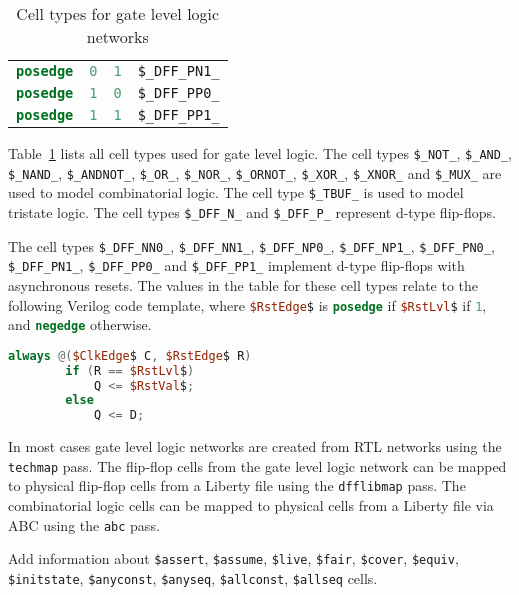 \begin{table}[t]
\begin{tabular}[t]{llll}
\lstinline[language=Verilog];posedge; & \lstinline[language=Verilog];0; & \lstinline[language=Verilog];1; & {\tt \$\_DFF\_PN1\_} \\
\lstinline[language=Verilog];posedge; & \lstinline[language=Verilog];1; & \lstinline[language=Verilog];0; & {\tt \$\_DFF\_PP0\_} \\
\lstinline[language=Verilog];posedge; & \lstinline[language=Verilog];1; & \lstinline[language=Verilog];1; & {\tt \$\_DFF\_PP1\_} \\
\end{tabular}
\caption{Cell types for gate level logic networks}
\label{tab:CellLib_gates}
\end{table}

Table~\ref{tab:CellLib_gates} lists all cell types used for gate level logic. The cell types
{\tt \$\_NOT\_}, {\tt \$\_AND\_}, {\tt \$\_NAND\_}, {\tt \$\_ANDNOT\_}, {\tt \$\_OR\_}, {\tt \$\_NOR\_},
{\tt \$\_ORNOT\_}, {\tt \$\_XOR\_}, {\tt \$\_XNOR\_} and {\tt \$\_MUX\_} are used to model combinatorial logic.
The cell type {\tt \$\_TBUF\_} is used to model tristate logic.
The cell types {\tt \$\_DFF\_N\_} and {\tt \$\_DFF\_P\_} represent d-type flip-flops.

The cell types {\tt \$\_DFF\_NN0\_}, {\tt \$\_DFF\_NN1\_}, {\tt \$\_DFF\_NP0\_}, {\tt \$\_DFF\_NP1\_},
{\tt \$\_DFF\_PN0\_}, {\tt \$\_DFF\_PN1\_}, {\tt \$\_DFF\_PP0\_} and {\tt \$\_DFF\_PP1\_} implement
d-type flip-flops with asynchronous resets. The values in the table for these cell types relate to the
following Verilog code template, where \lstinline[mathescape,language=Verilog];$RstEdge$; is \lstinline[language=Verilog];posedge;
if \lstinline[mathescape,language=Verilog];$RstLvl$; if \lstinline[language=Verilog];1;, and \lstinline[language=Verilog];negedge;
otherwise.

\begin{lstlisting}[mathescape,language=Verilog]
	always @($ClkEdge$ C, $RstEdge$ R)
		if (R == $RstLvl$)
			Q <= $RstVal$;
		else
			Q <= D;
\end{lstlisting}

In most cases gate level logic networks are created from RTL networks using the {\tt techmap} pass. The flip-flop cells
from the gate level logic network can be mapped to physical flip-flop cells from a Liberty file using the {\tt dfflibmap}
pass. The combinatorial logic cells can be mapped to physical cells from a Liberty file via ABC 
using the {\tt abc} pass.

\begin{fixme}
Add information about {\tt \$assert}, {\tt \$assume}, {\tt \$live}, {\tt \$fair}, {\tt \$cover}, {\tt \$equiv},
{\tt \$initstate}, {\tt \$anyconst}, {\tt \$anyseq}, {\tt \$allconst}, {\tt \$allseq} cells.
\end{fixme}

